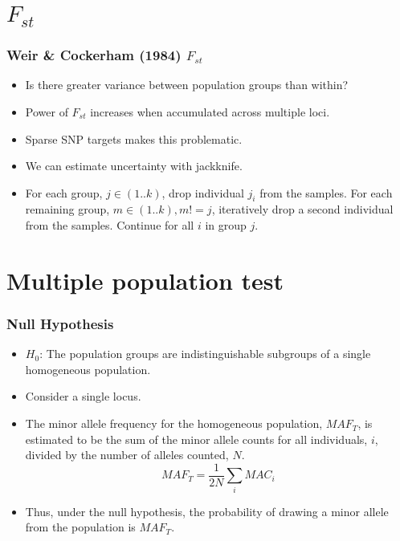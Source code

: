 \documentclass[aspectratio=1610]{beamer}
\begin{document}
\section{$F_{st}$}

\begin{frame}
\frametitle{Weir \& Cockerham (1984) $F_{st}$}
\begin{itemize}
\item Is there greater variance between population groups than within?
\item Power of $F_{st}$ increases when accumulated across multiple loci.
\item Sparse SNP targets makes this problematic.
\item We can estimate uncertainty with jackknife.
\item For each group, $j\in(1..k)$, drop individual $j_i$ from the samples.
	For each remaining group, $m\in(1..k), m!=j$, iteratively drop a second
	individual from the samples.
	Continue for all $i$ in group $j$.
\end{itemize}
\end{frame}

\section{Multiple population test}

\begin{frame}
\frametitle{Null Hypothesis}

\begin{itemize}
\item $H_0$: The population groups are indistinguishable subgroups of a
	single homogeneous population.
\item Consider a single locus.
\item The minor allele frequency for the homogeneous population, $MAF_T$,
	is estimated to be the sum of the minor allele counts for all individuals, $i$,
	divided by the number of alleles counted, $N$.
\begin{equation}
	MAF_T = \frac{1}{2N} \sum_{i} MAC_i
\end{equation}
\item Thus, under the null hypothesis, the probability of drawing a
	minor allele from the population is $MAF_T$.
\end{itemize}
\end{frame}
\end{document}
